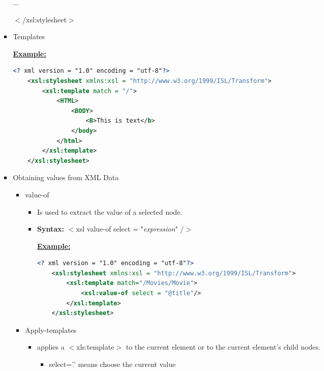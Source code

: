 \documentclass[12pt]{article}
\begin{document}
\begin{enumerate}[1.]
\begin{enumerate}[a)]
\begin{itemize}
            \quad...

            $<$/xsl:stylesheet$>$


            \item Templates

            \bigskip

            \underline{\textbf{Example:}}

    \begin{lstlisting}[language=XML]
    <? xml version = "1.0" encoding = "utf-8"?>
    <xsl:stylesheet xmlns:xsl = "http://www.w3.org/1999/ISL/Transform">
        <xsl:template match = "/">
            <HTML>
                <BODY>
                    <B>This is text</b>
                </body>
            </html>
        </xsl:template>
    </xsl:stylesheet>
    \end{lstlisting}

            \item Obtaining values from XML Data
            \begin{itemize}
                \item value-of
                \begin{itemize}
                    \item Is used to extract the value of a selected node.
                    \item \textbf{Syntax:} $<$xsl value-of select = "\textit{expression}" /$>$


                    \bigskip

                    \underline{\textbf{Example:}}

    \begin{lstlisting}[language=XML]
    <? xml version = "1.0" encoding = "utf-8"?>
    <xsl:stylesheet xmlns:xsl = "http://www.w3.org/1999/ISL/Transform">
        <xsl:template match="/Movies/Movie">
            <xsl:value-of select = "@title"/>
        </xsl:template>
    </xsl:stylesheet>
    \end{lstlisting}
                \end{itemize}

                \item Apply-templates
                \begin{itemize}
                    \item applies a $<$xls:template$>$ to the current element or
                    to the current element's child nodes.
                    \begin{itemize}
                        \item select='.' means choose the current value
                    \end{itemize}
                \end{itemize}


\end{itemize}
\end{itemize}
\end{enumerate}
\end{enumerate}
\end{document}
